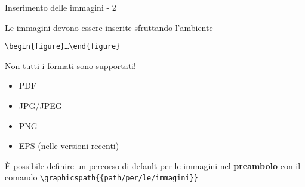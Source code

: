\begin{frame}{Inserimento delle immagini - 2}
	
Le immagini devono essere inserite sfruttando l'ambiente 
\centerline{
\texttt{\textbackslash{}begin\{figure\}\dots{}\textbackslash{}end\{figure\}}
}

\vfill

Non tutti i formati sono supportati!
\begin{itemize}
	\item PDF
	\item JPG/JPEG
	\item PNG
	\item EPS (nelle versioni recenti)
\end{itemize}

\vfill

È possibile definire un percorso di default per le immagini nel 
\textbf{preambolo} con il comando 
\texttt{\textbackslash{}graphicspath\{\{path/per/le/immagini\}\}}

\end{frame}
